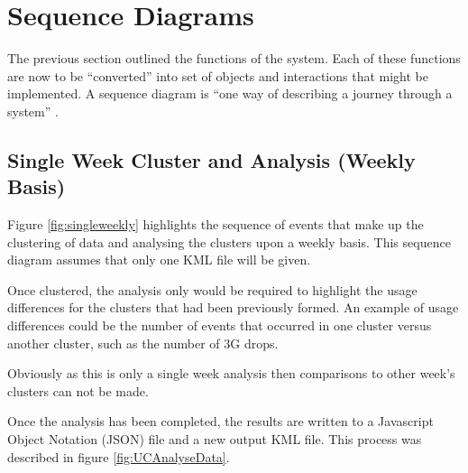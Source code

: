 \section{Sequence Diagrams}

The previous section outlined the functions of the system. Each of these 
functions are now to be ``converted'' into set of objects and interactions that 
might be implemented. A sequence diagram is ``one way of describing a journey 
through a system'' \citep{lunn03}.

\subsection{Single Week Cluster and Analysis (Weekly Basis)}
Figure \ref{fig:singleweekly} highlights the sequence of events that make up 
the clustering of data and analysing the clusters upon a weekly basis. This 
sequence diagram assumes that only one KML file will be given. 

Once clustered, the analysis only would be required to highlight the usage 
differences for the clusters that had been previously formed. An example of 
usage differences could be the number of events that occurred in one cluster 
versus another cluster, such as the number of 3G drops. 

Obviously as this is only a single week analysis then comparisons to other 
week's clusters can not be made.

Once the analysis has been completed, the results are written to a Javascript 
Object Notation (JSON) file and a new output KML file. This process was 
described in figure \ref{fig:UCAnalyseData}.




